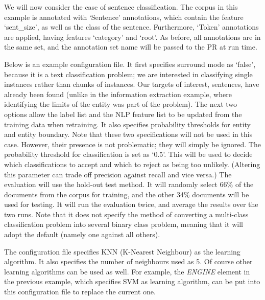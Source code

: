 
We will now consider the case of sentence classification. The corpus in this
example is annotated with `Sentence' annotations, which contain the feature
`sent\_size', as well as the class of the sentence. Furthermore, `Token'
annotations are applied, having features `category' and `root'. As before,
all annotations are in the same set, and the annotation set name will be passed
to the PR at run time.

Below is an example configuration file. It first specifies surround mode as
`false', because it is a text classification problem; we are interested in
classifying single instances rather than chunks of instances. Our targets of
interest, sentences, have already been found (unlike in the information
extraction example, where identifying the limits of the entity was part of the
problem). The next two options allow the label list and the NLP feature list to
be updated from the training data when retraining. It also specifies probability
thresholds for entity and entity boundary. Note that these two specifications
will not be used in this case. However, their presence is not problematic; they
will simply be ignored. The probability threshold for classification is set as
`0.5'. This will be used to decide which classifications to accept and which to
reject as being too unlikely. (Altering this parameter can trade off precision
against recall and vice versa.) The evaluation will use the hold-out test method.
It will randomly select 66\% of the documents from the corpus for training, and
the other 34\% documents will be used for testing. It will run the evaluation
twice, and average the results over the two runs. Note that it does not specify
the method of converting a multi-class classification problem into several binary
class problem, meaning that it will adopt the default (namely one against all
others).

The configuration file specifies KNN (K-Nearest Neighbour) as the learning
algorithm. It also specifies the number of neighbours used as 5. Of course other
learning algorithms can be used as well. For example, the {\em ENGINE} element in
the previous example, which specifies SVM as learning algorithm, can be put into
this configuration file to replace the current one.


